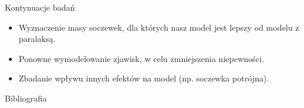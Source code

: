 \documentclass{beamer}
\begin{document}
\begin{frame}{Kontynuacje badań}
    \begin{itemize}
        \item Wyznaczenie masy soczewek, dla których nasz model jest lepszy od modelu z paralaksą.
        \item Ponowne wymodelowanie zjawisk, w celu zmniejszenia niepewności.
        \item Zbadanie wpływu innych efektów na model (np. soczewka potrójna).
    \end{itemize}
\end{frame}

\begin{frame}{Bibliografia}

    \printbibliography
    \nocite{*}
\end{frame}
\end{document}
